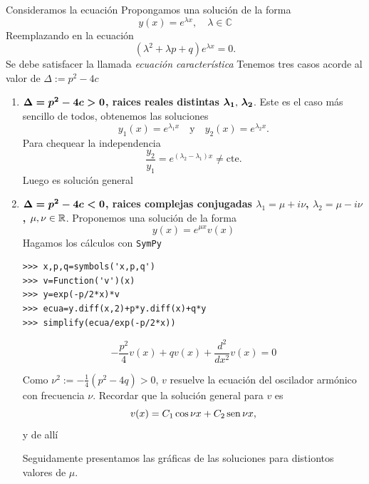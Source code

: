 Consideramos la ecuación
Propongamos una solución de la forma
\[\boxed{y(x)=e^{\lambda x},\quad \lambda\in\mathbb{C}}\]
Reemplazando en la ecuación
\[(\lambda^2+\lambda p+q)e^{\lambda x}=0.\]
Se debe satisfacer la llamada \emph{ecuación característica}
Tenemos tres casos acorde al valor de $\Delta:=p^2-4c$

\begin{enumerate}

\item \noindent \textbf{ $\b{\Delta=p^2-4c>0}$, raices reales distintas $\b{\lambda_1$, $\lambda_2}$}. Este es el caso más sencillo de todos, obtenemos las soluciones
\[y_1(x)=e^{\lambda_1 x}\quad\text{y}\quad y_2(x)=e^{\lambda_2 x}.\]
Para chequear la independencia
\[\frac{y_2}{y_1}=e^{(\lambda_2-\lambda_1)x}\neq\text{cte}.\]
Luego
es solución general


\item \noindent  \textbf{$\b{\Delta=p^2-4c<0}$, raices complejas conjugadas $\lambda_1=\mu+i\nu$, $\lambda_2=\mu-i\nu$, $\mu,\nu\in\rr$}.
Proponemos una solución de la forma
\[
y(x)=e^{\mu x}v(x)
\]
Hagamos los cálculos con \texttt{SymPy}





\begin{lstlisting}
>>> x,p,q=symbols('x,p,q')
>>> v=Function('v')(x)
>>> y=exp(-p/2*x)*v
>>> ecua=y.diff(x,2)+p*y.diff(x)+q*y
>>> simplify(ecua/exp(-p/2*x))

\end{lstlisting}

\[-\frac{p^{2}}{4} v{\left (x \right )} + q v{\left (x \right )} + \frac{d^{2}}{d x^{2}}  v{\left (x \right )}=0
 \]

Como $\nu^2:=-\frac{1}{4}(p^2-4q)>0$, $v$ resuelve  la ecuación del oscilador armónico con frecuencia $\nu$. Recordar que la solución general
para $v$ es
\[v(x)=C_1\cos \nu x +C_2\sen \nu x,\]
y de allí

Seguidamente presentamos las gráficas de las soluciones para distiontos valores de $\mu$.


\end{enumerate}
